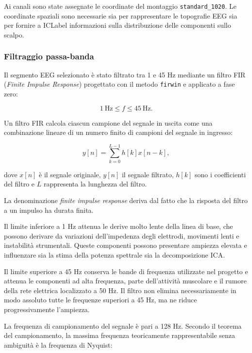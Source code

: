 Ai canali sono state assegnate le coordinate del montaggio
\texttt{standard\_1020}. Le coordinate spaziali sono necessarie sia
per rappresentare le topografie EEG sia per fornire a ICLabel
informazioni sulla distribuzione delle componenti sullo scalpo.


\subsubsection{Filtraggio passa-banda}

Il segmento EEG selezionato è stato filtrato tra 1 e 45 Hz mediante
un filtro FIR (\textit{Finite Impulse Response}) progettato con il
metodo \texttt{firwin} e applicato a fase zero:

\begin{equation}
	1\ \mathrm{Hz}
	\leq
	f
	\leq
	45\ \mathrm{Hz}.
\end{equation}

Un filtro FIR calcola ciascun campione del segnale in uscita come una
combinazione lineare di un numero finito di campioni del segnale in
ingresso:

\begin{equation}
	y[n]
	=
	\sum_{k=0}^{L-1}
	h[k]x[n-k],
\end{equation}

dove $x[n]$ è il segnale originale, $y[n]$ il segnale filtrato,
$h[k]$ sono i coefficienti del filtro e $L$ rappresenta la lunghezza
del filtro.

La denominazione \textit{finite impulse response} deriva dal fatto
che la risposta del filtro a un impulso ha durata finita.

Il limite inferiore a 1 Hz attenua le derive molto lente della linea
di base, che possono derivare da variazioni dell'impedenza degli
elettrodi, movimenti lenti e instabilità strumentali. Queste
componenti possono presentare ampiezza elevata e influenzare sia la
stima della potenza spettrale sia la decomposizione ICA.

Il limite superiore a 45 Hz conserva le bande di frequenza utilizzate
nel progetto e attenua le componenti ad alta frequenza, parte
dell'attività muscolare e il rumore della rete elettrica localizzato
a 50 Hz. Il filtro non elimina necessariamente in modo assoluto tutte
le frequenze superiori a 45 Hz, ma ne riduce progressivamente
l'ampiezza.

La frequenza di campionamento del segnale è pari a 128 Hz. Secondo il
teorema del campionamento, la massima frequenza teoricamente
rappresentabile senza ambiguità è la frequenza di Nyquist:

